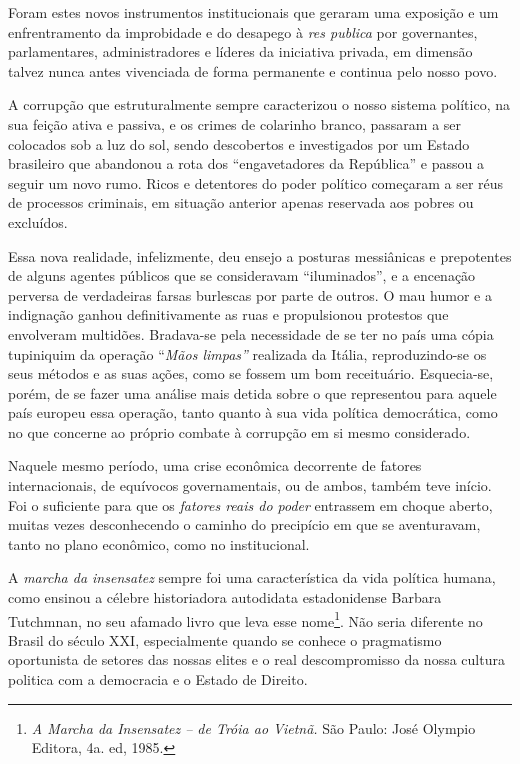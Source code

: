 Foram estes novos instrumentos institucionais que geraram uma exposição
e um enfrentramento da improbidade e do desapego à \emph{res publica}
por governantes, parlamentares, administradores e líderes da iniciativa
privada, em dimensão talvez nunca antes vivenciada de forma permanente e
continua pelo nosso povo.

A corrupção que estruturalmente sempre caracterizou o nosso sistema
político, na sua feição ativa e passiva, e os crimes de colarinho
branco, passaram a ser colocados sob a luz do sol, sendo descobertos e
investigados por um Estado brasileiro que abandonou a rota dos
``engavetadores da República'' e passou a seguir um novo rumo. Ricos e
detentores do poder político começaram a ser réus de processos
criminais, em situação anterior apenas reservada aos pobres ou
excluídos.

Essa nova realidade, infelizmente, deu ensejo a posturas messiânicas e
prepotentes de alguns agentes públicos que se consideravam
``iluminados'', e a encenação perversa de verdadeiras farsas burlescas
por parte de outros. O mau humor e a indignação ganhou definitivamente
as ruas e propulsionou protestos que envolveram multidões. Bradava-se
pela necessidade de se ter no país uma cópia tupiniquim da operação
``\emph{Mãos limpas''} realizada da Itália, reproduzindo-se os seus
métodos e as suas ações, como se fossem um bom receituário. Esquecia-se,
porém, de se fazer uma análise mais detida sobre o que representou para
aquele país europeu essa operação, tanto quanto à sua vida política
democrática, como no que concerne ao próprio combate à corrupção em si
mesmo considerado.

Naquele mesmo período, uma crise econômica decorrente de fatores
internacionais, de equívocos governamentais, ou de ambos, também teve
início. Foi o suficiente para que os \emph{fatores reais do poder}
entrassem em choque aberto, muitas vezes desconhecendo o caminho do
precipício em que se aventuravam, tanto no plano econômico, como no
institucional.

A \emph{marcha da insensatez} sempre foi uma característica da vida
política humana, como ensinou a célebre historiadora autodidata
estadonidense Barbara Tutchmnan, no seu afamado livro que leva esse
nome\footnote{\emph{A Marcha da Insensatez -- de Tróia ao Vietnã.} São
  Paulo: José Olympio Editora, 4a. ed, 1985.}. Não seria diferente no
Brasil do século XXI, especialmente quando se conhece o pragmatismo
oportunista de setores das nossas elites e o real descompromisso da
nossa cultura politica com a democracia e o Estado de Direito.

